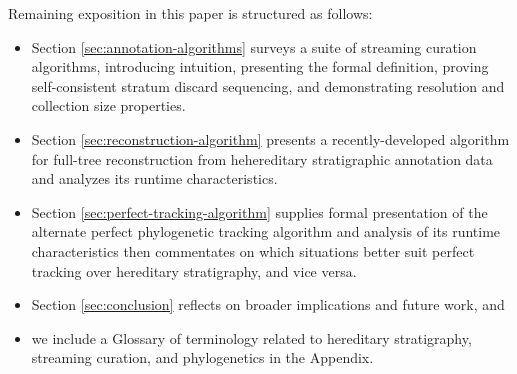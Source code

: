 Remaining exposition in this paper is structured as follows:
\begin{itemize}
\item Section \ref{sec:annotation-algorithms} surveys a suite of streaming curation algorithms, introducing intuition, presenting the formal definition, proving self-consistent stratum discard sequencing, and demonstrating resolution and collection size properties.
\item Section \ref{sec:reconstruction-algorithm} presents a recently-developed algorithm for full-tree reconstruction from hehereditary stratigraphic annotation data and analyzes its runtime characteristics.
\item Section \ref{sec:perfect-tracking-algorithm} supplies formal presentation of the alternate perfect phylogenetic tracking algorithm and analysis of its runtime characteristics then commentates on which situations better suit perfect tracking over hereditary stratigraphy, and vice versa.
\item Section \ref{sec:conclusion} reflects on broader implications and future work, and
\item we include a Glossary of terminology related to hereditary stratigraphy, streaming curation, and phylogenetics in the Appendix.
\end{itemize}
